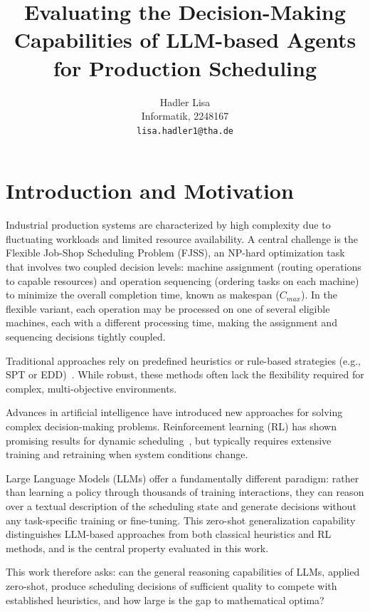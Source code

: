 \documentclass{article}
\title{Evaluating the Decision-Making Capabilities of LLM-based Agents for Production Scheduling}
\author{%
  Hadler Lisa \\
  Informatik, 2248167 \\
  \texttt{lisa.hadler1@tha.de} \\
}
\begin{document}
\maketitle

\section{Introduction and Motivation}

Industrial production systems are characterized by high complexity due to fluctuating workloads and limited resource availability. A central challenge is the Flexible Job-Shop Scheduling Problem (FJSS), an NP-hard optimization task that involves two coupled decision levels: machine assignment (routing operations to capable resources) and operation sequencing (ordering tasks on each machine) to minimize the overall completion time, known as makespan ($C_{max}$). In the flexible variant, each operation may be processed on one of several eligible machines, each with a different processing time, making the assignment and sequencing decisions tightly coupled.

Traditional approaches rely on predefined heuristics or rule-based strategies (e.g., SPT or EDD)~\cite[Chapter 3]{leungHandbookSchedulingAlgorithms2004}. While robust, these methods often lack the flexibility required for complex, multi-objective environments.

Advances in artificial intelligence have introduced new approaches for solving complex decision-making problems. Reinforcement learning (RL) has shown promising results for dynamic scheduling~\cite{WASCHNECK20181264, waschneckDeepReinforcementLearning2018, zhangDeepReinforcementLearning2023}, but typically requires extensive training and retraining when system conditions change.

Large Language Models (LLMs) offer a fundamentally different paradigm: rather
than learning a policy through thousands of training interactions, they can
reason over a textual description of the scheduling state and generate
decisions without any task-specific training or fine-tuning. This
zero-shot generalization capability distinguishes LLM-based approaches from
both classical heuristics and RL methods, and is the central property
evaluated in this work.

This work therefore asks: can the general reasoning capabilities of LLMs,
applied zero-shot, produce scheduling decisions of sufficient quality to
compete with established heuristics, and how large is the gap to mathematical
optima?
\end{document}
